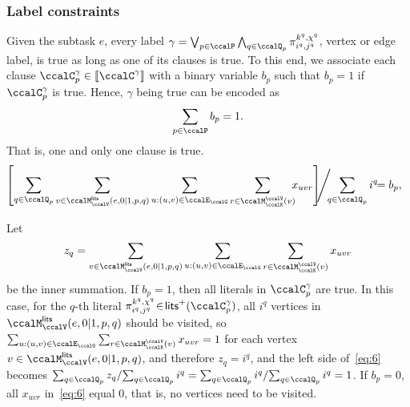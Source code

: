 \documentclass[journal]{IEEEtran}
\newcommand{\clause}[1]{\llbracket \ccalC^{#1} \rrbracket}
\renewcommand{\ap}[3]{\mathcal{\pi}_{{#1},{#2}}^{#3}}
\begin{document}
{  \subsubsection{Label constraints}\label{sec:labelconstraints} 
                {Given the subtask $e$, every label  $\gamma  = \bigvee_{p\in \ccalP} \bigwedge_{q\in \ccalQ_p} \ap{i^q}{j^q}{k^q,\chi^q}$, vertex or edge label,   is true as long as one of its clauses is true.} To this end, we associate each clause  $\ccalC_{p}^{\gamma} \in \clause{\gamma}$ with a binary variable $b_p$ such that $b_p=1$ if $\ccalC_{p}^{\gamma}$ is true. Hence, $\gamma$ being true can be encoded as
\begingroup\makeatletter\def\f@size{9}\check@mathfonts
\def\maketag@@@#1{\hbox{\m@th\normalsize\normalfont#1}}%
\begin{align}\label{eq:c}
   \sum_{p  \in \ccalP} b_p = 1.
\end{align}
\endgroup
That is, one and only one clause is true. 
\begingroup\makeatletter\def\f@size{9}\check@mathfonts
\def\maketag@@@#1{\hbox{\m@th\normalsize\normalfont#1}}%
\begin{align}
 \hspace{-0.3em}\!\!\! \left. \left[ \sum_{q\in \ccalQ_p} \sum_{v \in \ccalM^\mathsf{lits}_{\ccalV}(e,0|1,p,q)} \sum_{u: (u,v) \in \ccalE_\ccalG} \sum_{r\in \ccalM^\ccalV_{\ccalK}(v)} \!\!\!x_{uvr} \right] \!\!\middle/\!\! {\sum_{q\in \ccalQ_p} i^q} \!\!\!\right.= b_p, \label{eq:6}
\end{align}
\endgroup
{} {Let $$z_{q} = \sum_{v \in \ccalM^\mathsf{lits}_{\ccalV}(e,0|1,p,q)} \sum_{u: (u,v) \in \ccalE_\ccalG} \sum_{r\in \ccalM^\ccalV_{\ccalK}(v)} x_{uvr}$$ be the inner summation. If $b_p=1$, then all literals in $\ccalC_p^{\gamma}$ are true. In this case, for the $q$-th literal $\ap{i^q}{j^q}{k^q,\chi^q} \!\in\! \mathsf{lits}^+(\ccalC_p^\gamma)$, all $i^q$ vertices in ${\ccalM^\mathsf{lits}_{\ccalV}(e,0|1,p,q)}$ should be visited, so $\sum_{u: (u,v) \in \ccalE_\ccalG} \sum_{r\in \ccalM^\ccalV_{\ccalK}(v)} x_{uvr} = 1$ for each vertex $v \in {\ccalM^\mathsf{lits}_{\ccalV}(e,0|1,p,q)}$, and therefore $z_{q}\!=\! i^q$, and the left side of~\eqref{eq:6} becomes $ \sum_{q\in \ccalQ_p} z_q/ {\sum_{q\in \ccalQ_p} i^q} = {\sum_{q\in \ccalQ_p} i^q}/{\sum_{q\in \ccalQ_p} i^q} = 1 $. If $b_p\!=\!0$, all $x_{uvr}$ in~\eqref{eq:6} equal 0, that is, no vertices need to be visited.

}}
\end{document}
